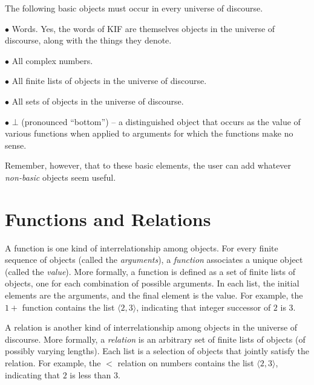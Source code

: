 The following basic objects must occur in every universe of discourse.

\medskip

\item{$\bullet$} Words.  Yes, the words of KIF are themselves objects in the universe
of discourse, along with the things they denote.

\medskip

\item{$\bullet$} All complex numbers.

\medskip

\item{$\bullet$} All finite lists of objects in the universe of discourse.

\medskip

\item{$\bullet$} All sets of objects in the universe of discourse.

\medskip

\item{$\bullet$} $\bot$ (pronounced ``bottom'') -- a distinguished object that
occurs as the value of various functions when applied to arguments for which
the functions make no sense.

\medskip

Remember, however, that to these basic elements, the user can
add whatever {\it non-basic} objects seem useful.

\section{Functions and Relations}

A function is one kind of interrelationship among objects.  For every finite
sequence of objects (called the {\it arguments}), a {\it function} associates a
unique object (called the {\it value}).  More formally, a function is defined as
a set of finite lists of objects, one for each combination of possible
arguments.  In each list, the initial elements are the arguments, and the final
element is the value.  For example, the $1+$ function contains the list
$\langle 2,3\rangle$, indicating that integer successor of $2$ is $3$.

A  relation is another kind of interrelationship among objects in the universe
of discourse.  More formally, a {\it relation} is an arbitrary set of finite
lists of objects (of possibly varying lengths).  Each list is a selection of
objects that jointly satisfy the relation.  For example, the $<$ relation on
numbers contains the list $\langle 2,3\rangle$, indicating that $2$ is
less than $3$.


